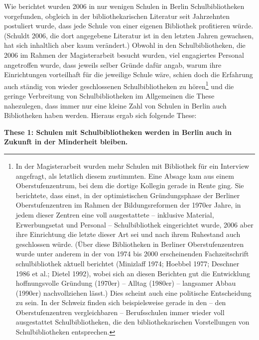 \documentclass[a4paper,
fontsize=11pt,
oneside,
numbers=noperiodatend,
parskip=half-,
bibliography=totoc,
final
]{scrartcl}
\begin{document}
Wie berichtet wurden 2006 in nur wenigen Schulen in Berlin
Schulbibliotheken vorgefunden, obgleich in der bibliothekarischen
Literatur seit Jahrzehnten postuliert wurde, dass jede Schule von einer
eigenen Bibliothek profitieren würde. (Schuldt 2006, die dort angegebene
Literatur ist in den letzten Jahren gewachsen, hat sich inhaltlich aber
kaum verändert.) Obwohl in den Schulbibliotheken, die 2006 im Rahmen der
Magisterarbeit besucht wurden, viel engagiertes Personal angetroffen
wurde, dass jeweils selber Gründe dafür angab, warum ihre Einrichtungen
vorteilhaft für die jeweilige Schule wäre, schien doch die Erfahrung
auch ständig von wieder geschlossenen Schulbibliotheken zu
hören\footnote{In der Magisterarbeit wurden mehr Schulen mit Bibliothek
  für ein Interview angefragt, als letztlich diesem zustimmten. Eine
  Absage kam aus einem Oberstufenzentrum, bei dem die dortige Kollegin
  gerade in Rente ging. Sie berichtete, dass einst, in der
  optimistischen Gründungsphase der Berliner Oberstufenzentren im Rahmen
  der Bildungsreformen der 1970er Jahre, in jedem dieser Zentren eine
  voll ausgestattete -- inklusive Material, Erwerbungsetat und Personal
  -- Schulbibliothek eingerichtet wurde, 2006 aber ihre Einrichtung die
  letzte dieser Art sei und nach ihrem Ruhestand auch geschlossen würde.
  (Über diese Bibliotheken in Berliner Oberstufenzentren wurde unter
  anderem in der von 1974 bis 2000 erscheinenden Fachzeitschrift
  schulbibliothek aktuell berichtet (Minizlaff 1974; Hoebbel 1977;
  Deschner 1986 et al.; Dietel 1992), wobei sich an diesen Berichten gut
  die Entwicklung hoffnungsvolle Gründung (1970er) -- Alltag (1980er) --
  langsamer Abbau (1990er) nachvollziehen lässt.) Dies scheint auch eine
  politische Entscheidung zu sein. In der Schweiz finden sich
  beispielsweise gerade in den -- den Oberstufenzentren vergleichbaren
  -- Berufsschulen immer wieder voll ausgestattet Schulbibliotheken, die
  den bibliothekarischen Vorstellungen von Schulbibliotheken
  entsprechen.} und die geringe Verbreitung von Schulbibliotheken im
Allgemeinen die These nahezulegen, dass immer nur eine kleine Zahl von
Schulen in Berlin auch Bibliotheken haben werden. Hieraus ergab sich
folgende These:

\textbf{These 1: Schulen mit Schulbibliotheken werden in Berlin auch in Zukunft
in der Minderheit bleiben.}
\end{document}
